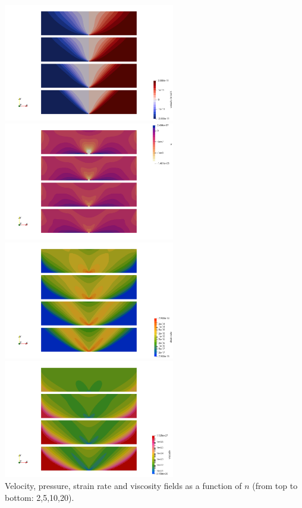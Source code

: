 \begin{center}
\includegraphics[width=7.5cm]{python_codes/fieldstone_87/results/experiment_02/vel.png}
\includegraphics[width=7.5cm]{python_codes/fieldstone_87/results/experiment_02/p.png}\\
\includegraphics[width=7.5cm]{python_codes/fieldstone_87/results/experiment_02/sr.png}
\includegraphics[width=7.5cm]{python_codes/fieldstone_87/results/experiment_02/eta.png}\\
{\captionfont Velocity, pressure, strain rate and viscosity fields as a function 
of $n$ (from top to bottom: 2,5,10,20).} 
\end{center}

